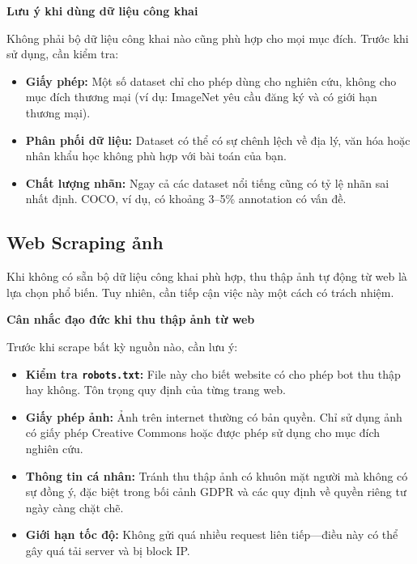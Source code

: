 \begin{mdframed}[style=infobox]
    \textbf{Lưu ý khi dùng dữ liệu công khai}

    Không phải bộ dữ liệu công khai nào cũng phù hợp cho mọi mục đích. Trước khi sử dụng, cần kiểm tra:
    \begin{itemize}
        \item \textbf{Giấy phép:} Một số dataset chỉ cho phép dùng cho nghiên cứu, không cho mục đích thương mại (ví dụ: ImageNet yêu cầu đăng ký và có giới hạn thương mại).
        \item \textbf{Phân phối dữ liệu:} Dataset có thể có sự chênh lệch về địa lý, văn hóa hoặc nhân khẩu học không phù hợp với bài toán của bạn.
        \item \textbf{Chất lượng nhãn:} Ngay cả các dataset nổi tiếng cũng có tỷ lệ nhãn sai nhất định. COCO, ví dụ, có khoảng 3--5\% annotation có vấn đề.
    \end{itemize}
\end{mdframed}

\subsection{Web Scraping ảnh}
\label{subsec:web_scraping}

Khi không có sẵn bộ dữ liệu công khai phù hợp, thu thập ảnh tự động từ web là lựa chọn phổ biến. Tuy nhiên, cần tiếp cận việc này một cách có trách nhiệm.

\begin{mdframed}[style=infobox]
    \textbf{Cân nhắc đạo đức khi thu thập ảnh từ web}

    Trước khi scrape bất kỳ nguồn nào, cần lưu ý:
    \begin{itemize}
        \item \textbf{Kiểm tra \texttt{robots.txt}:} File này cho biết website có cho phép bot thu thập hay không. Tôn trọng quy định của từng trang web.
        \item \textbf{Giấy phép ảnh:} Ảnh trên internet thường có bản quyền. Chỉ sử dụng ảnh có giấy phép Creative Commons hoặc được phép sử dụng cho mục đích nghiên cứu.
        \item \textbf{Thông tin cá nhân:} Tránh thu thập ảnh có khuôn mặt người mà không có sự đồng ý, đặc biệt trong bối cảnh GDPR và các quy định về quyền riêng tư ngày càng chặt chẽ.
        \item \textbf{Giới hạn tốc độ:} Không gửi quá nhiều request liên tiếp---điều này có thể gây quá tải server và bị block IP.
    \end{itemize}
\end{mdframed}

